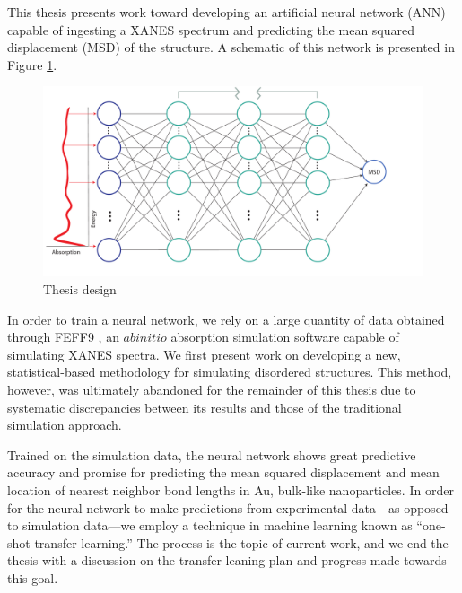 

This thesis presents work toward developing an artificial neural network (ANN) capable of ingesting a XANES spectrum and predicting the mean squared displacement (MSD) of the structure. A schematic of this network is presented in Figure \ref{fig:thesis-design}. 

\begin{figure}[h!]
    \centering
    \includegraphics[width=\linewidth]{Chapters/Figures/thesis-design.pdf}
    \caption[Project Approach]{Thesis design}
    \label{fig:thesis-design}
\end{figure}

In order to train a neural network, we rely on a large quantity of data obtained through FEFF9 \cite{feff-citation}, an $ ab initio $ absorption simulation software capable of simulating XANES spectra. We first present work on developing a new, statistical-based methodology for simulating disordered structures. This method, however, was ultimately abandoned for the remainder of this thesis due to systematic discrepancies between its results and those of the traditional simulation approach. 

Trained on the simulation data, the neural network shows great predictive accuracy and promise for predicting the mean squared displacement and mean location of nearest neighbor bond lengths in Au, bulk-like nanoparticles. In order for the neural network to make predictions from experimental data---as opposed to simulation data---we employ a technique in machine learning known as ``one-shot transfer learning.'' The process is the topic of current work, and we end the thesis with a discussion on the transfer-leaning plan and progress made towards this goal.



